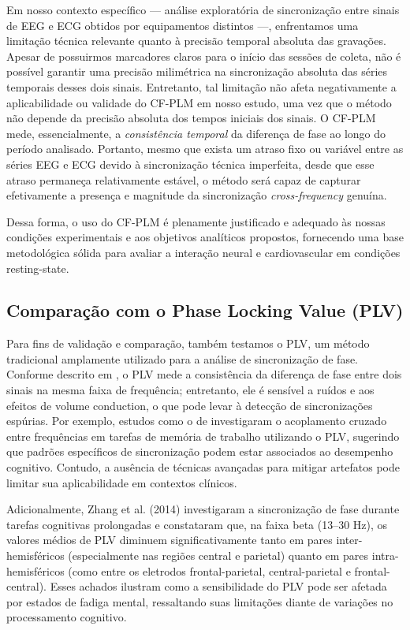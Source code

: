 Em nosso contexto específico — análise exploratória de sincronização entre sinais de EEG e ECG obtidos por equipamentos distintos —, enfrentamos uma limitação técnica relevante quanto à precisão temporal absoluta das gravações. Apesar de possuirmos marcadores claros para o início das sessões de coleta, não é possível garantir uma precisão milimétrica na sincronização absoluta das séries temporais desses dois sinais. Entretanto, tal limitação não afeta negativamente a aplicabilidade ou validade do CF-PLM em nosso estudo, uma vez que o método não depende da precisão absoluta dos tempos iniciais dos sinais. O CF-PLM mede, essencialmente, a \textit{consistência temporal} da diferença de fase ao longo do período analisado. Portanto, mesmo que exista um atraso fixo ou variável entre as séries EEG e ECG devido à sincronização técnica imperfeita, desde que esse atraso permaneça relativamente estável, o método será capaz de capturar efetivamente a presença e magnitude da sincronização \textit{cross-frequency} genuína.

Dessa forma, o uso do CF-PLM é plenamente justificado e adequado às nossas condições experimentais e aos objetivos analíticos propostos, fornecendo uma base metodológica sólida para avaliar a interação neural e cardiovascular em condições resting-state.


\subsection{Comparação com o Phase Locking Value (PLV)}

Para fins de validação e comparação, também testamos o PLV, um método tradicional amplamente utilizado para a análise de sincronização de fase. Conforme descrito em \cite{seraj2018cerebral}, o PLV mede a consistência da diferença de fase entre dois sinais na mesma faixa de frequência; entretanto, ele é sensível a ruídos e aos efeitos de volume conduction, o que pode levar à detecção de sincronizações espúrias. Por exemplo, estudos como o de \cite{abubaker2021working} investigaram o acoplamento cruzado entre frequências em tarefas de memória de trabalho utilizando o PLV, sugerindo que padrões específicos de sincronização podem estar associados ao desempenho cognitivo. Contudo, a ausência de técnicas avançadas para mitigar artefatos pode limitar sua aplicabilidade em contextos clínicos.

Adicionalmente, Zhang et al. (2014) \cite{zhang2014phase} investigaram a sincronização de fase durante tarefas cognitivas prolongadas e constataram que, na faixa beta (13--30 Hz), os valores médios de PLV diminuem significativamente tanto em pares inter-hemisféricos (especialmente nas regiões central e parietal) quanto em pares intra-hemisféricos (como entre os eletrodos frontal-parietal, central-parietal e frontal-central). Esses achados ilustram como a sensibilidade do PLV pode ser afetada por estados de fadiga mental, ressaltando suas limitações diante de variações no processamento cognitivo.

